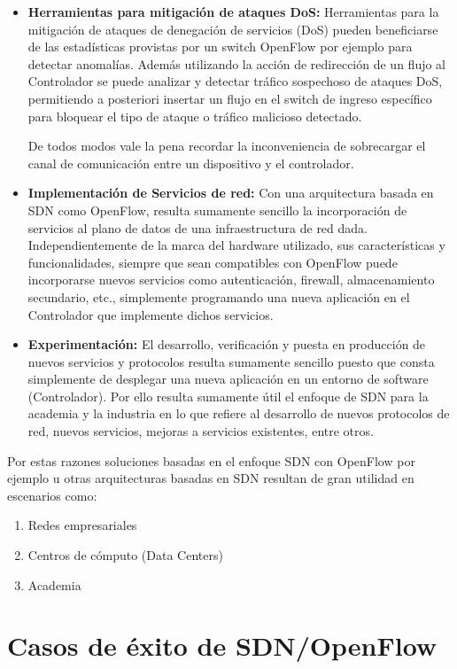 \begin{itemize}
\item \textbf{Herramientas para mitigación de ataques DoS:}
Herramientas para la mitigación de ataques de denegación de servicios (DoS) pueden beneficiarse de las estadísticas provistas por un switch OpenFlow por ejemplo para detectar anomalías. Además utilizando la acción de redirección de un flujo al Controlador se puede analizar y detectar tráfico sospechoso de ataques DoS, permitiendo a posteriori insertar un flujo en el switch de ingreso específico para bloquear el tipo de ataque o tráfico malicioso detectado. 

De todos modos vale la pena recordar la inconveniencia de sobrecargar el canal de comunicaci\'on entre un dispositivo y el controlador. 

\item \textbf{Implementaci\'on de Servicios de red:}
Con una arquitectura basada en SDN como OpenFlow, resulta sumamente sencillo la incorporación de servicios al plano de datos de una infraestructura de red dada. Independientemente de la marca del hardware utilizado, sus características y funcionalidades, siempre que sean compatibles con OpenFlow puede incorporarse nuevos servicios como autenticación, firewall, almacenamiento secundario, etc., simplemente programando una nueva aplicación en el Controlador que implemente dichos servicios.

\item \textbf{Experimentación:}
El desarrollo, verificación y puesta en producción de nuevos servicios y protocolos resulta sumamente sencillo puesto que consta simplemente de desplegar una nueva aplicación en un entorno de software 
 (Controlador). Por ello resulta sumamente útil el enfoque de SDN para la academia y la industria en lo que refiere al desarrollo de nuevos protocolos de red, nuevos servicios, mejoras a servicios existentes, entre otros.

\end{itemize}

Por estas razones soluciones basadas en el enfoque SDN con OpenFlow por ejemplo u otras arquitecturas basadas en SDN resultan de gran utilidad en escenarios como:

\begin{enumerate}
\item Redes empresariales
\item Centros de cómputo (Data Centers)
\item Academia
\end{enumerate}

\section{Casos de éxito de SDN/OpenFlow}
\label{section2.6}

